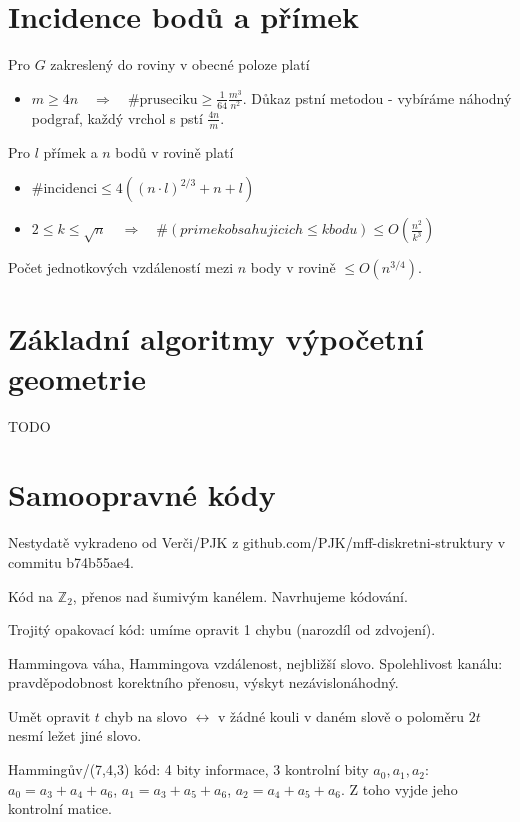 \documentclass[a4paper,10pt,titlepage]{article} \usepackage[utf8]{inputenc}
\def\Z{\mathbb{Z}}
\begin{document}
\section{Incidence bodů a přímek}
Pro $G$ zakreslený do roviny v obecné poloze platí
\begin{itemize}
\item $m \geq 4n \quad \Rightarrow \quad \text{\#pruseciku} \geq \frac{1}{64}\frac{m^3}{n^2}$.
\quad Důkaz pstní metodou - vybíráme náhodný podgraf, každý vrchol s pstí $\frac{4n}{m}$.

\end{itemize}

\noindent Pro $l$ přímek a $n$ bodů v rovině platí
\begin{itemize}
\item $\text{\#incidenci} \leq 4((n\cdot l)^{2/3} + n + l)$
\item $2 \leq k \leq \sqrt{n} \quad \Rightarrow \quad \#(primek obsahujicich \leq k bodu) \leq O(\frac{n^2}{k^3})$
\end{itemize}

\noindent Počet jednotkových vzdáleností mezi $n$ body v rovině $\leq O(n^{3/4}).$

\section{Základní algoritmy výpočetní geometrie}
TODO

\def\vykradeno{Nestydatě vykradeno od Verči/PJK z
github.com/PJK/mff-diskretni-struktury v commitu b74b55ae4.}

\section{Samoopravné kódy}
\vykradeno

Kód na $\Z_2$, přenos nad šumivým kanélem. Navrhujeme kódování.

Trojitý opakovací kód: umíme opravit 1 chybu (narozdíl od zdvojení).

Hammingova váha, Hammingova vzdálenost, nejbližší slovo. Spolehlivost kanálu:
pravděpodobnost korektního přenosu, výskyt nezávislonáhodný.

Umět opravit $t$ chyb na slovo $\leftrightarrow$ v žádné kouli v daném slově o
poloměru $2t$ nesmí ležet jiné slovo.

Hammingův/(7,4,3) kód: 4 bity informace, 3 kontrolní bity $a_0, a_1, a_2$:
$a_0=a_3+a_4+a_6$, $a_1=a_3+a_5+a_6$, $a_2=a_4+a_5+a_6$. Z toho vyjde jeho
kontrolní matice.
\end{document}
